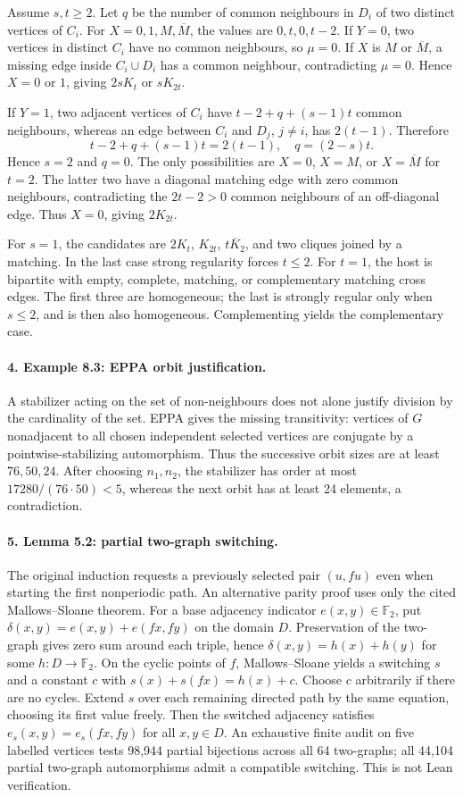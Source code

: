 \documentclass[11pt]{article}
\begin{document}
Assume $s,t\ge2$. Let $q$ be the number of common
neighbours in $D_i$ of two distinct vertices of $C_i$.
For $X=0,1,M,\overline M$, the values are $0,t,0,t-2$.
If $Y=0$, two vertices in distinct $C_i$ have no
common neighbours, so $\mu=0$. If $X$ is $M$ or
$\overline M$, a missing edge inside $C_i\cup D_i$
has a common neighbour, contradicting $\mu=0$.
Hence $X=0$ or $1$, giving $2sK_t$ or $sK_{2t}$.

If $Y=1$, two adjacent vertices of $C_i$ have
$t-2+q+(s-1)t$ common neighbours, whereas an edge
between $C_i$ and $D_j$, $j\ne i$, has $2(t-1)$.
Therefore
\[
 t-2+q+(s-1)t=2(t-1),\quad q=(2-s)t.
\]
Hence $s=2$ and $q=0$. The only possibilities are
$X=0$, $X=M$, or $X=\overline M$ for $t=2$.
The latter two have a diagonal matching edge
with zero common neighbours, contradicting the
$2t-2>0$ common neighbours of an off-diagonal edge.
Thus $X=0$, giving $2K_{2t}$.

For $s=1$, the candidates are $2K_t$, $K_{2t}$,
$\overline{tK_2}$, and two cliques joined by a matching.
In the last case strong regularity forces $t\le2$.
For $t=1$, the host is bipartite with empty,
complete, matching, or complementary matching cross edges.
The first three are homogeneous; the last is strongly
regular only when $s\le2$, and is then also homogeneous.
Complementing yields the complementary case.

\paragraph{4. Example 8.3: EPPA orbit justification.}
A stabilizer acting on the set of non-neighbours does not
alone justify division by the cardinality of the set.
EPPA gives the missing transitivity: vertices of $G$
nonadjacent to all chosen independent selected vertices
are conjugate by a pointwise-stabilizing automorphism.
Thus the successive orbit sizes are at least $76,50,24$.
After choosing $n_1,n_2$, the stabilizer has order
at most $17280/(76\cdot50)<5$, whereas the next orbit
has at least 24 elements, a contradiction.

\paragraph{5. Lemma 5.2: partial two-graph switching.}
The original induction requests a previously selected
pair $(u,fu)$ even when starting the first nonperiodic
path. An alternative parity proof uses only the cited
Mallows--Sloane theorem.
For a base adjacency indicator $e(x,y)\in\mathbb F_2$,
put $\delta(x,y)=e(x,y)+e(fx,fy)$ on the domain $D$.
Preservation of the two-graph gives zero sum around
each triple, hence $\delta(x,y)=h(x)+h(y)$ for some
$h:D\to\mathbb F_2$.
On the cyclic points of $f$, Mallows--Sloane yields a
switching $s$ and a constant $c$ with
$s(x)+s(fx)=h(x)+c$. Choose $c$ arbitrarily if
there are no cycles. Extend $s$ over each remaining
directed path by the same equation, choosing its
first value freely. Then the switched adjacency
satisfies $e_s(x,y)=e_s(fx,fy)$ for all $x,y\in D$.
An exhaustive finite audit on five labelled vertices
tests 98,944 partial bijections across all 64 two-graphs;
all 44,104 partial two-graph automorphisms admit
a compatible switching. This is not Lean verification.
\end{document}
